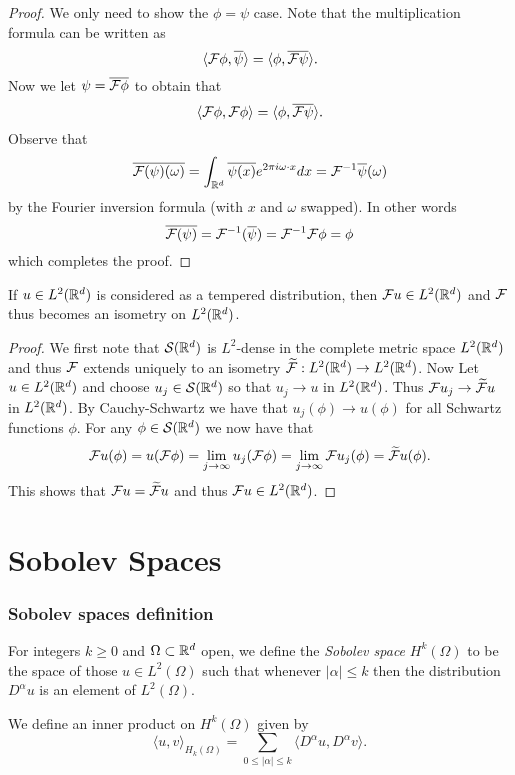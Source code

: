 \documentclass[twoside, a4paper, 10pt]{amsart}
\begin{document}
\begin{proof} We only need to show the $\phi = \psi$ case. Note that the multiplication formula can be written as $$\langle \mathcal{F} \phi, \overline{\psi} \rangle = \langle \phi, \overline{\mathcal{F} \psi } \rangle.$$ Now we let $\psi = \overline{\mathcal{F} \phi}$ to obtain that  $$\langle \mathcal{F} \phi, \mathcal{F} \phi \rangle = \langle \phi, \overline{\mathcal{F} \psi} \rangle.$$ Observe that $$\overline{\mathcal{F}(\psi)(\omega)} = \int_{\mathbb{R}^d} \overline{\psi(x)} e^{2\pi i \omega \cdot x} dx = \mathcal{F}^{-1} \overline{\psi} (\omega)$$ by the Fourier inversion formula (with $x$ and $\omega$ swapped). In other words $$\overline{\mathcal{F}(\psi)} = \mathcal{F}^{-1} (\overline{\psi}) = \mathcal{F}^{-1} \mathcal{F} \phi = \phi$$ which completes the proof. \end{proof}

\begin{thm} If $u \in L^2(\mathbb{R}^d)$ is considered as a tempered distribution, then $\mathcal{F} u \in L^2(\mathbb{R}^d)$ and $\mathcal{F}$ thus becomes an isometry on $L^2(\mathbb{R}^d)$.

\end{thm}

\begin{proof} We first note that $\mathcal{S}(\mathbb{R}^d)$ is $L^2$-dense in the complete metric space $L^2(\mathbb{R}^d)$ and thus $\mathcal{F}$ extends uniquely to an isometry $\widetilde{\mathcal{F}}:L^2(\mathbb{R}^d) \to L^2(\mathbb{R}^d)$. Now Let $u \in L^2(\mathbb{R}^d)$ and choose  $u_j \in \mathcal{S}(\mathbb{R}^d)$ so that $u_j \to u$ in $L^2(\mathbb{R}^d)$. Thus $\mathcal{F} u_j \to \widetilde{\mathcal{F}} u$ in $L^2(\mathbb{R}^d)$. By Cauchy-Schwartz we have that $u_j(\phi) \to u (\phi)$ for all Schwartz functions $\phi$. For any $\phi \in \mathcal{S}(\mathbb{R}^d)$ we now have that $$\mathcal{F} u (\phi) = u(\mathcal{F} \phi) = \lim_{j \to \infty} u_j(\mathcal{F} \phi) = \lim_{j \to \infty} \mathcal{F} u_j (\phi) = \widetilde{\mathcal{F}} u(\phi).$$ This shows that $\mathcal{F} u = \widetilde{\mathcal{F}}u$ and thus $\mathcal{F} u \in L^2(\mathbb{R}^d)$. \end{proof}


\part{Sobolev Spaces}

\section{Sobolev spaces definition}

\begin{mydef} For integers $k \geq 0$ and $\Omega \subset \mathbb{R}^d$ open, we define the \textit{Sobolev space} $H^k(\Omega)$ to be the space of those $u \in L^2(\Omega)$ such that whenever $|\alpha| \leq k$ then the distribution $D^{\alpha}u$ is an element of $L^2(\Omega)$.

We define an inner product on $H^k(\Omega)$ given by $$\langle u, v \rangle_{H_k(\Omega)} = \sum_{0 \leq |\alpha| \leq k} \langle D^{\alpha}u, D^{\alpha}v \rangle.$$

\end{mydef}
\end{document}
